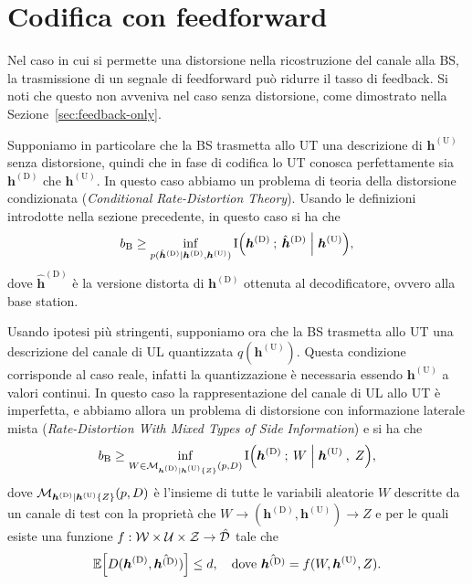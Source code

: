 \section{Codifica con feedforward}
\label{sec:with-feedforward}

Nel caso in cui si permette una distorsione nella ricostruzione del canale alla
BS, la trasmissione di un segnale di feedforward può ridurre il tasso di
feedback. Si noti che questo non avveniva nel caso senza distorsione, come
dimostrato nella Sezione~\ref{sec:feedback-only}.

Supponiamo in particolare che la BS trasmetta allo UT una descrizione di
\(\bm{h}^\mathrm{(U)}\) senza distorsione, quindi che in fase di codifica lo UT
conosca perfettamente sia \(\bm{h}^\mathrm{(D)}\) che \(\bm{h}^\mathrm{(U)}\).
In questo caso abbiamo un problema di teoria della distorsione condizionata
(\textit{Conditional Rate-Distortion Theory}). Usando le definizioni introdotte
nella sezione precedente, in questo caso si ha \cite{Gray1972ConditionalRT} che
\begin{equation}
    b_\mathrm{B} \ge \inf_{p(
        \hat{\bm{h}}^\mathrm{(D)} \mid \bm{h}^\mathrm{(D)}, \bm{h}^\mathrm{(U)}
    )}
    \mutual{
        \bm{h}^\mathrm{(D)}
    }{
        \hat{\bm{h}}^\mathrm{(D)} \given \bm{h}^\mathrm{(U)}
    } , \label{eq:rate-with-wz-and-feedforward}
\end{equation}
dove \(\hat{\bm{h}}^\mathrm{(D)}\) è la versione distorta di
\(\bm{h}^\mathrm{(D)}\) ottenuta al decodificatore, ovvero alla base station.

Usando ipotesi più stringenti, supponiamo ora che la BS trasmetta allo UT una
descrizione del canale di UL quantizzata \(q(\bm{h}^\mathrm{(U)})\). Questa
condizione corrisponde al caso reale, infatti la quantizzazione è necessaria
essendo \(\bm{h}^\mathrm{(U)}\) a valori continui. In questo caso la
rappresentazione del canale di UL allo UT è imperfetta, e abbiamo allora un
problema di distorsione con informazione laterale mista
(\textit{Rate-Distortion With Mixed Types of Side Information}) e si ha
\cite{1614094} che
\begin{equation}
    b_\mathrm{B} \ge \inf_{W \in \set{M}_{
        \bm{h}^\mathrm{(D)} \mid \bm{h}^\mathrm{(U)} \{Z\}
    }(p, D)} \mutual{
        \bm{h}^\mathrm{(D)}
    }{
        W \given \bm{h}^\mathrm{(U)} \:,\; Z
    } , \label{eq:rate-with-wz-mixed-si}
\end{equation}
dove \(\mathcal{M}_{\bm{h}^\mathrm{(D)} \mid \bm{h}^\mathrm{(U)} \{Z\}}(p, D)\) è
l'insieme di tutte le variabili aleatorie \(W\) descritte da un canale di test
con la proprietà che \(W \to (\bm{h}^\mathrm{(D)}, \bm{h}^\mathrm{(U)}) \to Z\)
e per le quali esiste una funzione \(f: \mathcal{W} \times \mathcal{U} \times \mathcal{Z}
\to \hat{\mathcal{D}}\) tale che
\begin{equation}
    \expect{D(\bm{h}^\mathrm{(D)}, \hat{\bm{h}^\mathrm{(D)}})} \le d, \quad
    \textrm{dove } \hat{\bm{h}^\mathrm{(D)}} = f(W, \bm{h}^\mathrm{(U)}, Z) .
\end{equation}

